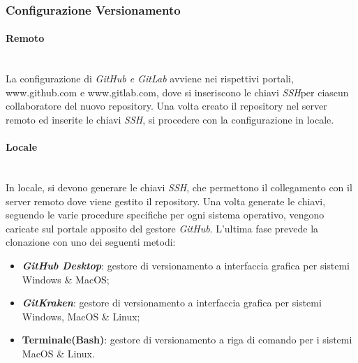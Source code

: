 \subsubsection{Configurazione Versionamento}

\paragraph{Remoto} \-\\
	La configurazione di \textit{GitHub e GitLab} avviene nei rispettivi portali, www.github.com e www.gitlab.com, dove si inseriscono le chiavi \textit{SSH}\glossario per ciascun collaboratore del nuovo repository. 
	Una volta creato il repository nel server remoto ed inserite le chiavi \textit{SSH}, si procedere con la configurazione in locale.
	
\paragraph{Locale} \-\\
	In locale, si devono generare le chiavi \textit{SSH}, che permettono il collegamento con il server remoto dove viene gestito il repository. 
	Una volta generate le chiavi, seguendo le varie procedure specifiche per ogni sistema operativo, vengono caricate sul portale apposito del gestore \textit{GitHub}.
	L'ultima fase prevede la clonazione con uno dei seguenti metodi: 

	\begin{itemize}
		\item \textbf{\textit{GitHub Desktop}}: gestore di versionamento a interfaccia grafica per sistemi Windows \& MacOS; 
		\item \textbf{\textit{GitKraken}}: gestore di versionamento a interfaccia grafica per sistemi Windows, MacOS \& Linux; 		
		\item \textbf{Terminale(Bash)}: gestore di versionamento a riga di comando per i sistemi MacOS \& Linux.
	\end{itemize}
		